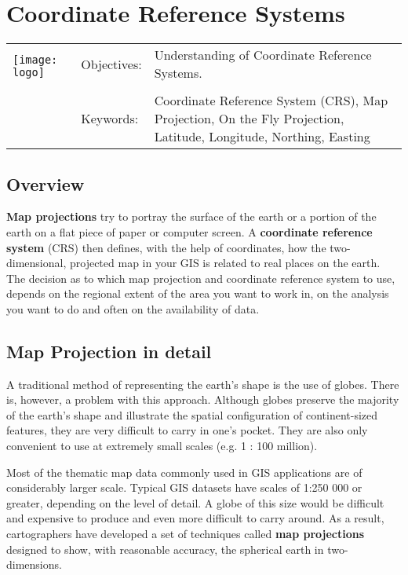 

\section{Coordinate Reference Systems}\label{sec:crs}
\begin{tabular}{p{3.5cm}p{6cm}p{6cm}}
\multirow{2}{*}{\texttt{[image: logo]}} & Objectives: &
Understanding of Coordinate Reference Systems. \\
& & \\
& Keywords: & 
Coordinate Reference System (CRS), Map Projection, On the Fly Projection,
Latitude, Longitude, Northing, Easting  \\
\hline
\end{tabular}

\subsection{Overview}

\textbf{Map projections} try to portray the surface of the earth or a portion of the
earth on a flat piece of paper or computer screen. A \textbf{coordinate reference
system} (CRS) then defines, with the help of coordinates, how the
two-dimensional, projected map in your GIS is related to real places on the
earth. The decision as to which map projection and coordinate reference
system to use, depends on the regional extent of the area you want to work
in, on the analysis you want to do and often on the availability of data.

\subsection{Map Projection in detail}

A traditional method of representing the earth's shape is the use of globes.
There is, however, a problem with this approach. Although globes preserve the
majority of the earth's shape and illustrate the spatial configuration of
continent-sized features, they are very difficult to carry in one's pocket.
They are also only convenient to use at extremely small scales (e.g. 1 : 100
million).

Most of the thematic map data commonly used in GIS applications are of
considerably larger scale. Typical GIS datasets have scales of 1:250 000 or
greater, depending on the level of detail. A globe of this size would be
difficult and expensive to produce and even more difficult to carry around.
As a result, cartographers have developed a set of techniques called
\textbf{map projections} designed to show, with reasonable accuracy, the
spherical earth in two-dimensions.

